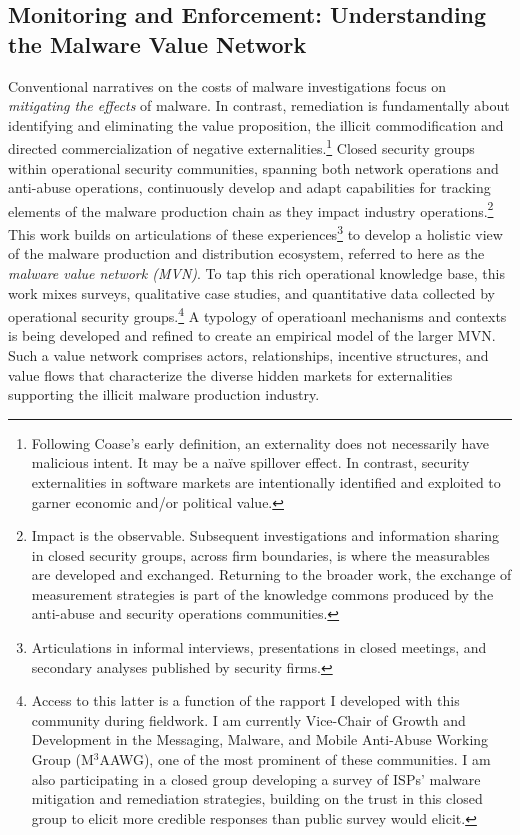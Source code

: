 \documentclass[12pt,journal,compsoc,letterpaper,onecolumn,twoside]{IEEEtran}
\begin{document}
\subsection{Monitoring and Enforcement: Understanding the Malware
  Value Network} \label{sec:mvn}


Conventional narratives on the costs of malware investigations focus on
\emph{mitigating the effects} of malware.
%
In contrast, remediation is fundamentally about identifying and
eliminating the value proposition, the illicit commodification and
directed commercialization of negative externalities.\footnote{Following
  Coase's early definition, an externality does not necessarily have
  malicious intent.  It may be a na{\"{i}}ve spillover effect.  In contrast,
  security externalities in software markets are intentionally
  identified and exploited to garner economic and/or political value.} 
%
Closed security groups within operational security communities, spanning
both network operations and anti-abuse operations, continuously
develop and adapt 
capabilities for tracking elements of the malware production chain as
they impact industry operations.\footnote{Impact is the observable.
  Subsequent investigations and information sharing in closed security groups,
  across firm boundaries, is where the measurables are developed and
  exchanged.  Returning to the broader work, the exchange of
  measurement strategies is part of the knowledge commons produced by
  the anti-abuse and security operations communities.} 
%
This work builds on articulations of these
experiences\footnote{Articulations in informal interviews,
  presentations in closed meetings, and secondary analyses published
  by security firms.} to develop a holistic view of the
malware production and distribution ecosystem, referred to
here as the \emph{malware value network (MVN)}.
%
To tap this rich operational knowledge base, this work mixes
surveys, 
qualitative case studies, and quantitative data collected by
operational security groups.\footnote{Access to this latter is a
  function of the rapport I developed with this community
  during fieldwork.  I am currently Vice-Chair of Growth and
  Development in the Messaging, Malware, and Mobile Anti-Abuse Working
  Group (M$^3$AAWG), one of the most prominent of these
  communities.  I am also participating in a closed group
  developing a survey of ISPs' malware mitigation and remediation
  strategies, building on the trust in this closed group to elicit
  more credible responses than public survey would elicit.}
%
A typology of operatioanl mechanisms and contexts is being developed
and refined to 
create an empirical model of the larger MVN.
%
%
Such a value network comprises actors, relationships,
incentive structures, and value flows that characterize the diverse hidden
markets for externalities supporting the illicit malware production
industry.
%
\end{document}

